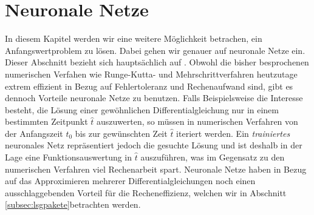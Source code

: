 \section{Neuronale Netze}
In diesem Kapitel werden wir eine weitere Möglichkeit betrachen, ein Anfangswertproblem zu lösen.
Dabei gehen wir genauer auf neuronale Netze ein. Dieser Abschnitt bezieht sich hauptsächlich auf
\cite{ovidiucalinDeepLearningArchitectures}. Obwohl die bisher besprochenen numerischen Verfahen wie Runge-Kutta- und
Mehrschrittverfahren heutzutage extrem effizient in Bezug auf Fehlertoleranz und Rechenaufwand sind, gibt es dennoch
Vorteile neuronale Netze zu benutzen. Falls Beispielsweise die Interesse besteht, die Lösung einer gewöhnlichen
Differentialgleichung nur in einem bestimmten Zeitpunkt $\hat{t}$ auszuwerten, so müssen in numerischen Verfahren von
der Anfangszeit $t_0$ bis zur gewünschten Zeit $\hat{t}$ iteriert werden. Ein \textit{trainiertes} neuronales Netz
repräsentiert jedoch die gesuchte Lösung und ist deshalb in der Lage eine Funktionsauswertung in $\hat{t}$ auszuführen,
was im Gegensatz zu den numerischen Verfahren viel Rechenarbeit spart. Neuronale Netze haben in Bezug auf das
Approximieren mehrerer Differentialgleichungen noch einen ausschlaggebenden Vorteil für die Recheneffizienz, welchen
wir in Abschnitt \ref{subsec:lsgpakete}betrachten werden.

